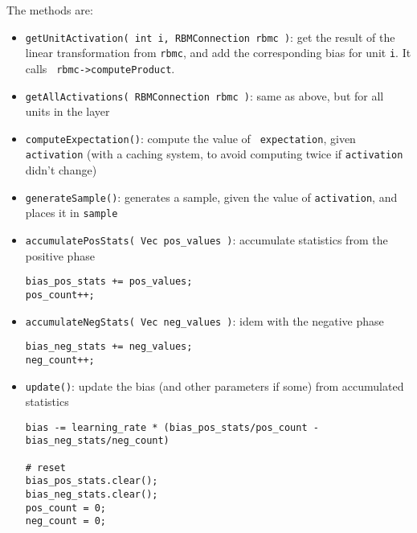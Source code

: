 \documentclass[11pt]{book}
\begin{document}
The methods are:
\begin{itemize}

    \item {\tt getUnitActivation( int i, RBMConnection rbmc )}:
    get the result of the linear transformation from {\tt rbmc},
    and add the corresponding bias for unit {\tt i}. It calls {\tt
    rbmc->computeProduct}.

    \item {\tt getAllActivations( RBMConnection rbmc )}: same as above,
    but for all units in the layer

    \item {\tt computeExpectation()}: compute the value of {\tt
    expectation}, given {\tt activation} (with a caching system, to
    avoid computing twice if {\tt activation} didn't change)

    \item {\tt generateSample()}: generates a sample, given the value of
    {\tt activation}, and places it in {\tt sample}

    \item {\tt accumulatePosStats( Vec pos\_values )}: accumulate
    statistics from the positive phase

\begin{verbatim}
bias_pos_stats += pos_values;
pos_count++;
\end{verbatim}

    \item {\tt accumulateNegStats( Vec neg\_values )}: idem with the
    negative phase

\begin{verbatim}
bias_neg_stats += neg_values;
neg_count++;
\end{verbatim}

    \item {\tt update()}: update the bias (and other parameters if some)
    from accumulated statistics

\begin{verbatim}
bias -= learning_rate * (bias_pos_stats/pos_count - bias_neg_stats/neg_count)

# reset
bias_pos_stats.clear();
bias_neg_stats.clear();
pos_count = 0;
neg_count = 0;
\end{verbatim}
\end{itemize}
\end{document}
